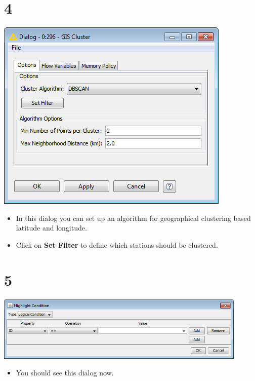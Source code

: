 \documentclass{beamer}
\begin{document}
\section{4}
\begin{frame}
	\begin{center}
  		\includegraphics[height=0.6\textheight]{4.png}
	\end{center}
	\begin{itemize}
		\item In this dialog you can set up an algorithm for geographical clustering based latitude and longitude.
		\item Click on \textbf{Set Filter} to define which stations should be clustered.
	\end{itemize}
\end{frame}

\section{5}
\begin{frame}
	\begin{center}
  		\includegraphics[width=0.9\textwidth]{5.png}
	\end{center}
	\begin{itemize}
		\item You should see this dialog now.
	\end{itemize}
\end{frame}
\end{document}
